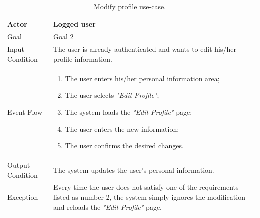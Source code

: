 \begin{table}[H]
\begin{center}
\begin{tabular}{p{} | p{}}
\hline
Actor & Logged user\\
\hline
Goal & Goal 2\\
\hline
Input Condition & The user is already authenticated and wants to edit his/her profile information.\\
\hline
Event Flow & 
\begin{enumerate}
\item The user enters his/her personal information area;
\item The user selects \emph{"Edit Profile"};
\item The system loads the \emph{"Edit Profile"} page;
\item The user enters the new information;
\item The user confirms the desired changes.
\end{enumerate} \\
\hline
Output Condition & The system updates the user's personal information.\\
\hline
Exception & Every time the user does not satisfy one of the requirements listed as number 2, the system simply ignores the modification and reloads the \emph{"Edit Profile"} page.\\
\hline
\end{tabular}
\end{center}
\caption{Modify profile use-case.}
\label{modify_profile_uc}
\end{table}

